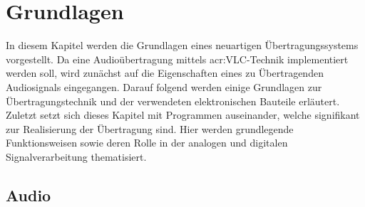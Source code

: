 \chapter{Grundlagen}
\label{chap:fundamentals_related-work}
In diesem Kapitel werden die Grundlagen eines neuartigen Übertragungssystems vorgestellt. Da eine Audioübertragung mittels \gls{acr:VLC}-Technik implementiert werden soll, wird zunächst auf die Eigenschaften eines zu Übertragenden Audiosignals eingegangen. Darauf folgend werden einige Grundlagen zur Übertragungstechnik und der verwendeten elektronischen Bauteile erläutert. Zuletzt setzt sich dieses Kapitel mit Programmen auseinander, welche signifikant zur Realisierung der Übertragung sind. Hier werden grundlegende Funktionsweisen sowie deren Rolle in der analogen und digitalen Signalverarbeitung thematisiert. 

\section{Audio}
\label{subsec:Unterabschnitt1}

